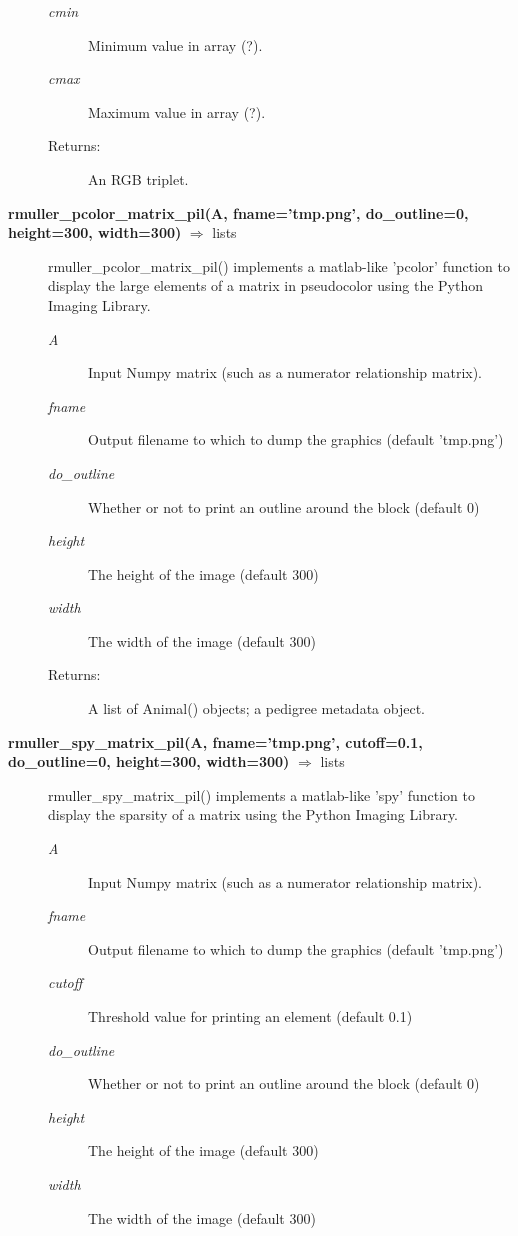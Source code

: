 \begin{description}
\begin{description}
\item[\emph{cmin}] Minimum value in array (?).
\item[\emph{cmax}] Maximum value in array (?).
\item[Returns:] An RGB triplet.
\end{description}
\item[\textbf{rmuller\_pcolor\_matrix\_pil(A, fname='tmp.png', do\_outline=0, height=300, width=300)} $\Rightarrow$ lists]
rmuller\_pcolor\_matrix\_pil() implements a matlab-like 'pcolor' function to display the large elements of a matrix in pseudocolor using the Python Imaging Library.
\begin{description}
\item[\emph{A}] Input Numpy matrix (such as a numerator relationship matrix).
\item[\emph{fname}] Output filename to which to dump the graphics (default 'tmp.png')
\item[\emph{do\_outline}] Whether or not to print an outline around the block (default 0)
\item[\emph{height}] The height of the image (default 300)
\item[\emph{width}] The width of the image (default 300)
\item[Returns:] A list of Animal() objects; a pedigree metadata object.
\end{description}
\item[\textbf{rmuller\_spy\_matrix\_pil(A, fname='tmp.png', cutoff=0.1, do\_outline=0, height=300, width=300)} $\Rightarrow$ lists]
rmuller\_spy\_matrix\_pil() implements a matlab-like 'spy' function to display the sparsity of a matrix using the Python Imaging Library.
\begin{description}
\item[\emph{A}] Input Numpy matrix (such as a numerator relationship matrix).
\item[\emph{fname}] Output filename to which to dump the graphics (default 'tmp.png')
\item[\emph{cutoff}] Threshold value for printing an element (default 0.1)
\item[\emph{do\_outline}] Whether or not to print an outline around the block (default 0)
\item[\emph{height}] The height of the image (default 300)
\item[\emph{width}] The width of the image (default 300)

\end{description}
\end{description}
